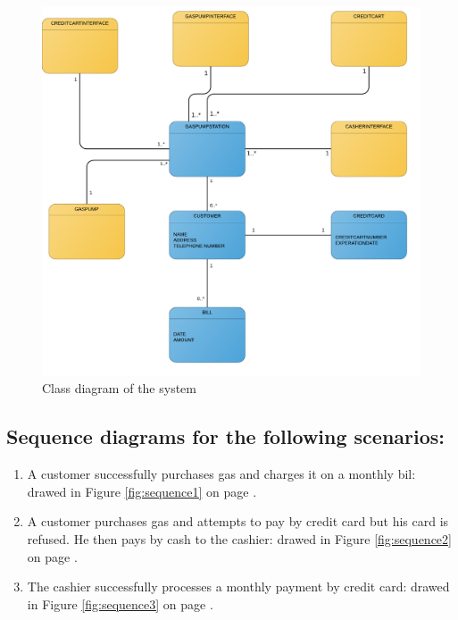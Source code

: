 \documentclass[11pt,a4paper]{article}
\begin{document}
\begin{figure}[H]
 \centering
 \includegraphics[width=\textwidth]{../class.png} 
 \caption{Class diagram of the system}
 \label{fig:class}
\end{figure}



\subsection*{Sequence diagrams for the following scenarios:}
\begin{enumerate}
	\item A customer successfully purchases gas and charges it on a monthly bil: drawed in Figure \ref{fig:sequence1} on page \pageref{fig:sequence1}.
	\item A customer purchases gas and attempts to pay by credit card but his card is refused. He then pays by cash to the cashier: drawed in Figure \ref{fig:sequence2} on page \pageref{fig:sequence2}.
	\item The cashier successfully processes a monthly payment by credit card: drawed in Figure \ref{fig:sequence3} on page \pageref{fig:sequence3}.
\end{enumerate}
\end{document}
